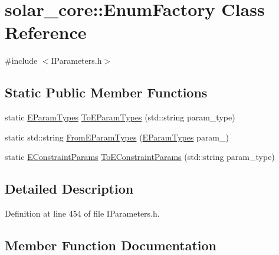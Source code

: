 \hypertarget{classsolar__core_1_1_enum_factory}{}\section{solar\+\_\+core\+:\+:Enum\+Factory Class Reference}
\label{classsolar__core_1_1_enum_factory}


{\ttfamily \#include $<$I\+Parameters.\+h$>$}

\subsection*{Static Public Member Functions}
\begin{DoxyCompactItemize}
\item 
static \hyperlink{namespacesolar__core_aa1147341e5ef7a40d68d1bd68e149362}{E\+Param\+Types} \hyperlink{classsolar__core_1_1_enum_factory_a573986ee0b4951d5ecc6a8c100f892e8}{To\+E\+Param\+Types} (std\+::string param\+\_\+type)
\item 
static std\+::string \hyperlink{classsolar__core_1_1_enum_factory_a7f31a62dd221ed41128618d9eb74b4ee}{From\+E\+Param\+Types} (\hyperlink{namespacesolar__core_aa1147341e5ef7a40d68d1bd68e149362}{E\+Param\+Types} param\+\_\+)
\item 
static \hyperlink{namespacesolar__core_ac827fdef4412a3c0d5e44d3f31908e49}{E\+Constraint\+Params} \hyperlink{classsolar__core_1_1_enum_factory_a1763c822c6b7da0b574ef80045cd59a8}{To\+E\+Constraint\+Params} (std\+::string param\+\_\+type)
\end{DoxyCompactItemize}


\subsection{Detailed Description}


Definition at line 454 of file I\+Parameters.\+h.



\subsection{Member Function Documentation}
\hypertarget{classsolar__core_1_1_enum_factory_a7f31a62dd221ed41128618d9eb74b4ee}{}
